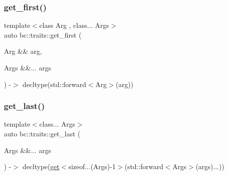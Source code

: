 \mbox{\label{namespacebc_1_1traits_ad9cf2c4adfbd50e98364152dfd32174a}} 
\subsubsection{\texorpdfstring{get\+\_\+first()}{get\_first()}}
{\footnotesize\ttfamily template$<$class Arg , class... Args$>$ \\
auto bc\+::traits\+::get\+\_\+first (\begin{DoxyParamCaption}\item[{Arg \&\&}]{arg,  }\item[{Args \&\&...}]{args }\end{DoxyParamCaption}) -\/$>$ decltype(std\+::forward$<$Arg$>$(arg))
}

\mbox{\label{namespacebc_1_1traits_a96ff03a1928b8a28225a152f7a093cdf}} 
\subsubsection{\texorpdfstring{get\+\_\+last()}{get\_last()}}
{\footnotesize\ttfamily template$<$class... Args$>$ \\
auto bc\+::traits\+::get\+\_\+last (\begin{DoxyParamCaption}\item[{Args \&\&...}]{args }\end{DoxyParamCaption}) -\/$>$ decltype(\hyperlink{namespacebc_1_1traits_a4de446de235c05a01f9143b54df5a136}{get}$<$sizeof...(Args)-\/1$>$(std\+::forward$<$Args$>$(args)...))
}

